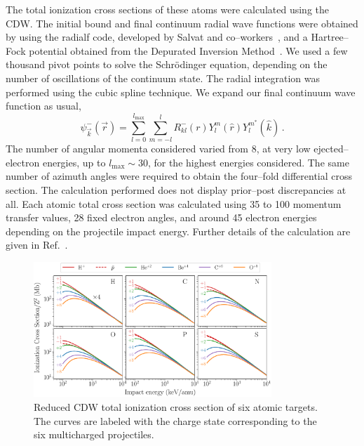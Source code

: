 \documentclass[preprint,showpacs]{revtex4}
\begin{document}
The total ionization cross sections of these atoms were calculated using 
the CDW. The initial bound and final continuum radial wave 
functions were obtained by using the {\sc radialf} code, developed by 
Salvat and co--workers~\cite{salvat1995}, and a Hartree--Fock potential 
obtained from the Depurated Inversion Method~\cite{mendez2016,mendez2018}. 
We used a few thousand pivot points to solve the Schr\"{o}dinger 
equation, depending on the number of oscillations of the continuum 
state. The radial integration was performed using the cubic spline 
technique. We expand our final continuum wave function as usual,
\begin{equation}
\psi_{\overrightarrow{k}}^{-}(\overrightarrow{r})=\sum_{l=0}^{l_{\max
}}\sum_{m=-l}^{l}R_{kl}^{-}(r)Y_{l}^{m}(\widehat{r})Y_{l}^{m^{\ast }}
(\widehat{k})\,.
\label{eq:contwave}
\end{equation}
The number of angular momenta considered varied from 8, at 
very low ejected--electron energies, up to $l_{\max}\sim 30$, 
for the highest energies 
considered. The same number of azimuth angles were required to obtain 
the four--fold differential cross section. The calculation performed does 
not display prior--post discrepancies at all. Each atomic total cross 
section was calculated using 35 to 100 momentum transfer values, 28 
fixed electron angles, and around 45 electron energies depending on the 
projectile impact energy. 
Further details of the calculation are given in Ref.~\cite{montanari2017}. 


\begin{figure}[t!]
\centering
\includegraphics[width=0.8\textwidth]{figuras/atomicscaling.eps}
\caption{Reduced CDW total ionization cross section of six atomic 
targets. The curves are labeled with the charge state corresponding to 
the six multicharged projectiles.}
\label{fig:atomscaling}
\end{figure} 
\end{document}
